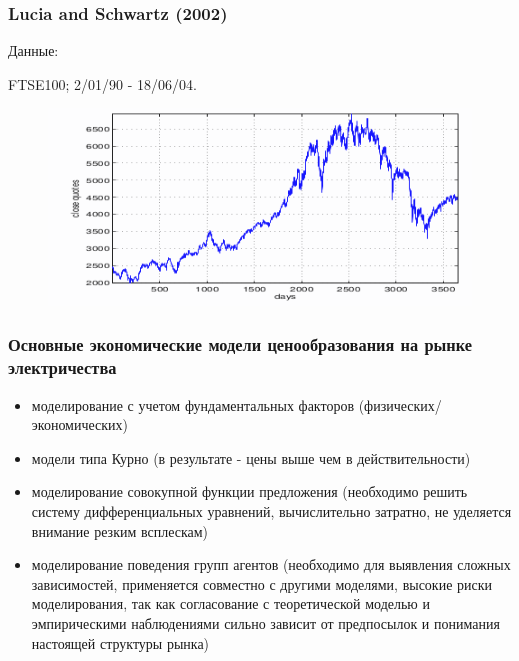 \documentclass[c, dvipsnames]{beamer}  %
\begin{document}
\begin{frame}[shrink=5]
\frametitle{Lucia and Schwartz (2002)} 

Данные: 

FTSE100; 2/01/90 - 18/06/04. 

\begin{figure}
	\centering
	\includegraphics[width=0.7\linewidth]{screenshot008}
	\caption{}
	\label{fig:screenshot008}
\end{figure}



\end{frame}



\begin{frame}[shrink=5]
\frametitle{Основные экономические модели ценообразования на рынке электричества} 


\begin{itemize}
	\item  моделирование с учетом фундаментальных факторов (физических/экономических)
	\item модели типа Курно (в результате - цены выше чем в действительности)
	\item моделирование совокупной функции предложения (необходимо решить систему дифференциальных уравнений, вычислительно затратно, не уделяется внимание резким всплескам) 
	\item  моделирование поведения групп агентов  (необходимо для выявления сложных зависимостей, применяется совместно с другими моделями, высокие риски моделирования, так как согласование с теоретической моделью  и эмпирическими наблюдениями сильно зависит от предпосылок и понимания настоящей структуры рынка)
	
\end{itemize}

\end{frame}
\end{document}
